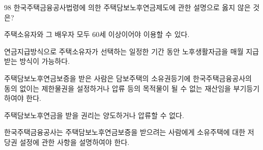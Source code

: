 \begin{question}{98}
한국주택금융공사법령에 의한 주택담보노후연금제도에 관한 설명으로 옳지 않은 것은?
\begin{choices}
  \item 주택소유자와 그 배우자 모두 60세 이상이어야 이용할 수 있다.
  \item 연금지급방식으로 주택소유자가 선택하는 일정한 기간 동안 노후생활자금을 매월 지급받는 방식이 가능하다.
  \item 주택담보노후연금보증을 받은 사람은 담보주택의 소유권등기에 한국주택금융공사의 동의 없이는 제한물권을 설정하거나 압류 등의 목적물이 될 수 없는 재산임을 부기등기 하여야 한다.
  \item 주택담보노후연금을 받을 권리는 양도하거나 압류할 수 없다.
  \item 한국주택금융공사는 주택담보노후연금보증을 받으려는 사람에게 소유주택에 대한 저당권 설정에 관한 사항을 설명하여야 한다.
\end{choices}
\end{question}

